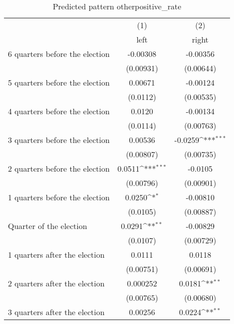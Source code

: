 \begin{table}[htbp]\centering
\def\sym#1{\ifmmode^{#1}\else\(^{#1}\)\fi}
\caption{Predicted pattern otherpositive\_rate}
\begin{tabular}{l*{2}{c}}
\hline\hline
                    &\multicolumn{1}{c}{(1)}&\multicolumn{1}{c}{(2)}\\
                    &\multicolumn{1}{c}{left}&\multicolumn{1}{c}{right}\\
\hline
 6 quarters before the election&    -0.00308         &    -0.00356         \\
                    &   (0.00931)         &   (0.00644)         \\
[1em]
 5 quarters before the election&     0.00671         &    -0.00124         \\
                    &    (0.0112)         &   (0.00535)         \\
[1em]
 4 quarters before the election&      0.0120         &    -0.00134         \\
                    &    (0.0114)         &   (0.00763)         \\
[1em]
 3 quarters before the election&     0.00536         &     -0.0259\sym{***}\\
                    &   (0.00807)         &   (0.00735)         \\
[1em]
 2 quarters before the election&      0.0511\sym{***}&     -0.0105         \\
                    &   (0.00796)         &   (0.00901)         \\
[1em]
 1 quarters before the election&      0.0250\sym{*}  &    -0.00810         \\
                    &    (0.0105)         &   (0.00887)         \\
[1em]
Quarter of the election&      0.0291\sym{**} &    -0.00829         \\
                    &    (0.0107)         &   (0.00729)         \\
[1em]
 1 quarters after the election&      0.0111         &      0.0118         \\
                    &   (0.00751)         &   (0.00691)         \\
[1em]
 2 quarters after the election&    0.000252         &      0.0181\sym{**} \\
                    &   (0.00765)         &   (0.00680)         \\
[1em]
 3 quarters after the election&     0.00256         &      0.0224\sym{**} \\

\end{tabular}
\end{table}

